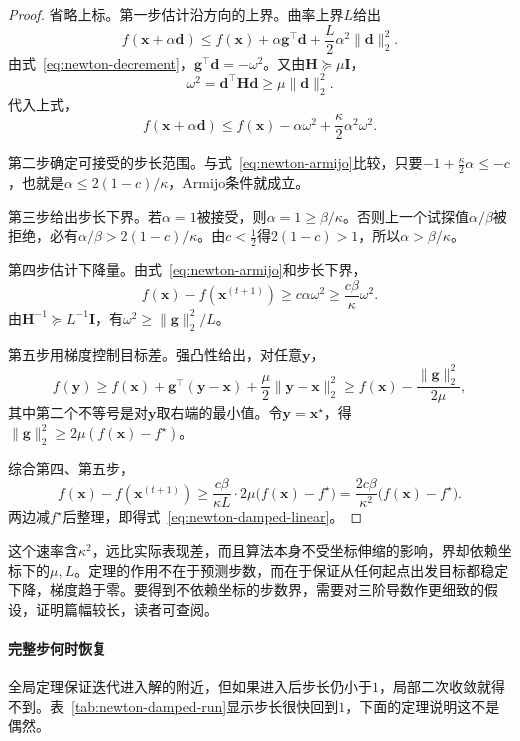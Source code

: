 \begin{proof}
省略上标。第一步估计沿方向的上界。曲率上界$L$给出
\[
 f(\bm{x}+\alpha\bm{d})\leq f(\bm{x})+\alpha\bm{g}^\top\bm{d}+\frac L2\alpha^2\lVert\bm{d}\rVert_2^2.
\]
由式~\eqref{eq:newton-decrement}，$\bm{g}^\top\bm{d}=-\omega^2$。又由$\bm{H}\succeq\mu\bm{I}$，
\[
 \omega^2=\bm{d}^\top\bm{H}\bm{d}\geq\mu\lVert\bm{d}\rVert_2^2.
\]
代入上式，
\[
 f(\bm{x}+\alpha\bm{d})\leq f(\bm{x})-\alpha\omega^2+\frac\kappa2\alpha^2\omega^2.
\]

第二步确定可接受的步长范围。与式~\eqref{eq:newton-armijo}比较，只要$-1+\tfrac\kappa2\alpha\leq-c$，也就是$\alpha\leq2(1-c)/\kappa$，Armijo条件就成立。

第三步给出步长下界。若$\alpha=1$被接受，则$\alpha=1\geq\beta/\kappa$。否则上一个试探值$\alpha/\beta$被拒绝，必有$\alpha/\beta>2(1-c)/\kappa$。由$c<\tfrac12$得$2(1-c)>1$，所以$\alpha>\beta/\kappa$。

第四步估计下降量。由式~\eqref{eq:newton-armijo}和步长下界，
\[
 f(\bm{x})-f(\bm{x}^{(t+1)})\geq c\alpha\omega^2\geq\frac{c\beta}\kappa\omega^2.
\]
由$\bm{H}^{-1}\succeq L^{-1}\bm{I}$，有$\omega^2\geq\lVert\bm{g}\rVert_2^2/L$。

第五步用梯度控制目标差。强凸性给出，对任意$\bm{y}$，
\[
 f(\bm{y})\geq f(\bm{x})+\bm{g}^\top(\bm{y}-\bm{x})+\frac\mu2\lVert\bm{y}-\bm{x}\rVert_2^2\geq f(\bm{x})-\frac{\lVert\bm{g}\rVert_2^2}{2\mu},
\]
其中第二个不等号是对$\bm{y}$取右端的最小值。令$\bm{y}=\bm{x}^\star$，得$\lVert\bm{g}\rVert_2^2\geq2\mu(f(\bm{x})-f^\star)$。

综合第四、第五步，
\[
 f(\bm{x})-f(\bm{x}^{(t+1)})\geq\frac{c\beta}{\kappa L}\cdot2\mu\bigl(f(\bm{x})-f^\star\bigr)=\frac{2c\beta}{\kappa^2}\bigl(f(\bm{x})-f^\star\bigr).
\]
两边减$f^\star$后整理，即得式~\eqref{eq:newton-damped-linear}。
\end{proof}

这个速率含$\kappa^2$，远比实际表现差，而且算法本身不受坐标伸缩的影响，界却依赖坐标下的$\mu,L$。定理的作用不在于预测步数，而在于保证从任何起点出发目标都稳定下降，梯度趋于零。要得到不依赖坐标的步数界，需要对三阶导数作更细致的假设，证明篇幅较长，读者可查阅。

\paragraph{完整步何时恢复}
全局定理保证迭代进入解的附近，但如果进入后步长仍小于$1$，局部二次收敛就得不到。表~\ref{tab:newton-damped-run}显示步长很快回到$1$，下面的定理说明这不是偶然。

